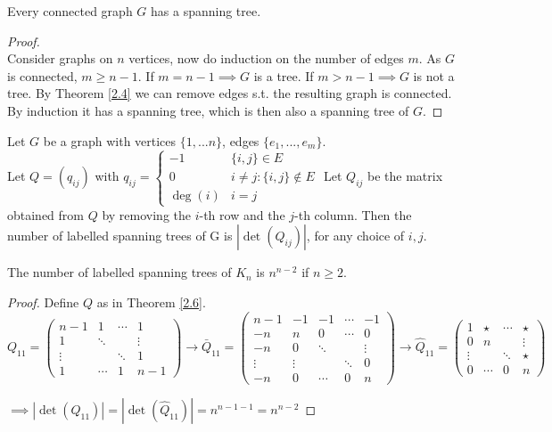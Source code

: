 \vspace{1cm}
\begin{corollary}\label{2.5}
    Every connected graph $G$ has a spanning tree.
\end{corollary}
\begin{proof}
\hfill \\
    Consider graphs on $n$ vertices, now do induction on the number of edges $m$. As $G$ is connected, $m\geq n-1$. If $m=n-1\implies G$ is a tree. If $m>n-1\implies G$ is not a tree. By Theorem \ref{2.4} we can remove edges s.t. the resulting graph is connected. By induction it has a spanning tree, which is then also a spanning tree of $G$.
\end{proof}
\vspace{0.5cm}
\begin{theorem}\label{2.6}
    \hfill
    Let $G$ be a graph with vertices $\{1,...n\}$, edges $\{e_1,...,e_m\}$. \\
    Let $Q=(q_{ij})$ with $q_{ij}=\begin{cases}
            -1 & \{i,j\}\in E \\
            0 & i\neq j:\{i,j\}\notin E\\
            \deg(i) & i=j
            \end{cases}$ 
    Let $Q_{ij}$ be the matrix obtained from $Q$ by removing the $i$-th row and the $j$-th column. Then the number of labelled spanning trees of G is $|\det(Q_{ij})|$, for any choice of $i,j$.
\end{theorem}
\vspace{0.5cm}
\begin{corollary}\label{2.7}
    The number of labelled spanning trees of $K_n$ is $n^{n-2}$ if $n\geq 2$.
\end{corollary}
\begin{proof}
    Define $Q$ as in Theorem \ref{2.6}. \\
    $Q_{11}=\begin{pmatrix}
        n-1 & 1 & \cdots & 1\\
        1 & \ddots & & \vdots\\
        \vdots & & \ddots & 1\\
        1 &\cdots & 1 & n-1
    \end{pmatrix}\xrightarrow{}\bar Q_{11}=\begin{pmatrix}
        n-1 & -1 & -1&\cdots & -1\\
        -n & n &0&\cdots & 0\\
        -n & 0 & \ddots & & \vdots\\
        \vdots & \vdots & &\ddots &0\\
       -n &0&\cdots & 0 & n
    \end{pmatrix}\xrightarrow{}\hat Q_{11}=\begin{pmatrix}
        1 & \star & \cdots & \star\\
        0 & n & & \vdots\\
        \vdots & & \ddots & \star\\
        0 &\cdots & 0 & n
    \end{pmatrix}$\par
    $\implies |\det(Q_{11})|=|\det(\hat Q_{11})|=n^{n-1-1}=n^{n-2}$
\end{proof}